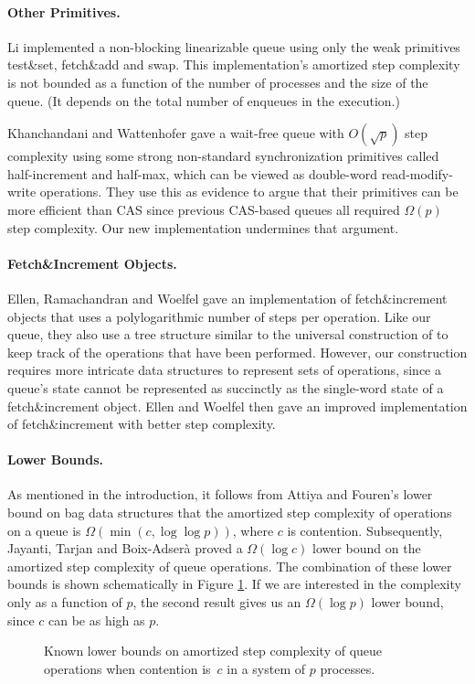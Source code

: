 
\paragraph{Other Primitives.}
Li \cite{Li01} implemented a non-blocking linearizable queue using only the weak primitives
test\&set, fetch\&add and swap.
This implementation's amortized step complexity is not bounded
as a function of the number of processes and the size of the queue.
(It depends on the total number of enqueues in the execution.)

Khanchandani and Wattenhofer \cite{KW18} gave a wait-free queue 
with $O(\sqrt{p})$ step complexity using some strong non-standard synchronization primitives
called half-increment and half-max, which can be viewed as %
double-word read-modify-write operations.
They use this as evidence to argue that their primitives can be more efficient than CAS
since previous CAS-based queues all required $\Omega(p)$ step complexity.
Our new implementation undermines that argument.

\paragraph{Fetch\&Increment Objects.}
Ellen, Ramachandran and Woelfel \cite{ERW12} gave an implementation of 
fetch\&increment objects that uses a polylogarithmic number of steps per operation.
Like our queue, they also use a tree structure similar to the universal construction of 
\cite{DBLP:conf/stoc/AfekDT95} to keep track of the operations
that have been performed.
However, our construction requires more intricate
data structures to represent sets of operations, since a queue's state cannot be represented as succinctly
as the single-word state of a fetch\&increment object.
Ellen and Woelfel \cite{10.1007/978-3-642-41527-2_20} then gave an improved implementation of fetch\&increment with better step complexity.

\paragraph{Lower Bounds.}
As mentioned in the introduction, it follows from Attiya and Fouren's lower bound on bag data structures
\cite{DBLP:conf/opodis/AttiyaF17} that the
amortized step complexity of operations on a queue is $\Omega(\min(c,\log\log p))$, where $c$ is contention.
Subsequently, Jayanti, Tarjan and Boix-Adser\`{a} \cite{JTB19} proved a  $\Omega(\log c)$ lower bound on
the amortized step complexity of queue operations.
The combination of these lower bounds is shown schematically in Figure \ref{graph-lb}.
If we are interested in the complexity only as a function of $p$, the second result
gives us an $\Omega(\log p)$ lower bound, since $c$ can be as high as $p$.

\begin{figure}

\caption{Known lower bounds on amortized step complexity of queue operations when contention is~$c$ in a system of $p$ processes.\label{graph-lb}}
\end{figure}

